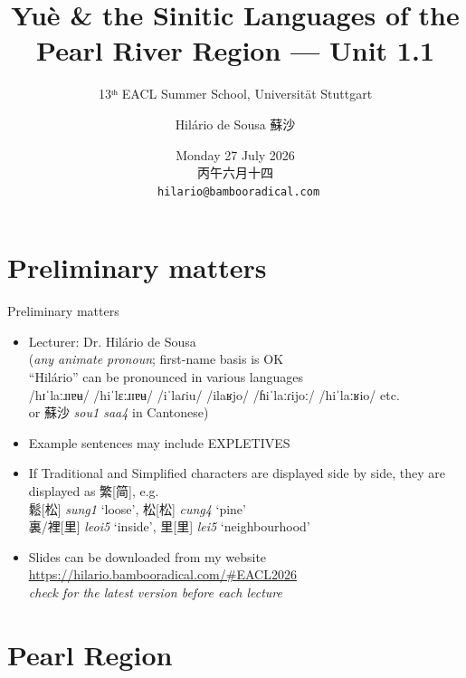 \documentclass{beamer}
\title[Pearl River Sinitic]{Yuè \& the Sinitic Languages of the Pearl River Region --- Unit 1.1}
\subtitle{13ᵗʰ EACL Summer School, Universität Stuttgart}
\author{Hilário de Sousa 蘇沙}
\institute{EHESS–CRLAO \\ {\tiny membre associé}}
\date{Monday 27 July 2026 \\ 丙午六月十四 \\ {\footnotesize \texttt{ hilario@bambooradical.com}}}
\begin{document}
\begin{frame}
  \titlepage
\end{frame}


\section{Preliminary matters}

\begin{frame}{Preliminary matters}

\begin{itemize}
  \item Lecturer: Dr. Hilário de Sousa\\ 
  (\textit{\small any animate pronoun}; first-name basis is OK\\
  \enquote{Hilário} can be pronounced in various languages\\ {\tiny /hɪˈlaːɹɪɐʉ/ /hiˈlɛːɹɪɐʉ/ /iˈlaɾiu/ /ilaʁjo/ /ɦiˈlaːɾijoː/ /hiˈlaːʁio/ etc.}\\  
   or 蘇沙 \emph{sou1 saa4} in Cantonese)
  \item Example sentences may include EXPLETIVES
  \item If Traditional and Simplified characters are displayed side by side, they are displayed as 繁[简], e.g. \\ 鬆[松] \emph{sung1} \enquote*{loose}, 松[松] \emph{cung4} \enquote*{pine} \\ 裏/裡[里] \emph{leoi5} \enquote*{inside}, 里[里] \emph{lei5} \enquote*{neighbourhood}
  \item Slides can be downloaded from my website \url{https://hilario.bambooradical.com/\#EACL2026}\\ \quad \emph{check for the latest version before each lecture}
\end{itemize}

\end{frame}

\section{Pearl Region}
\end{document}
